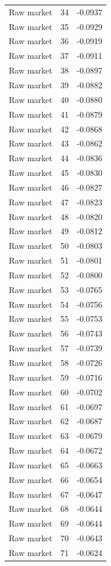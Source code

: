 \begin{table}[htbp]
\begin{tabular}{lll}
Raw market & 34 & -0.0937 \\
Raw market & 35 & -0.0929 \\
Raw market & 36 & -0.0919 \\
Raw market & 37 & -0.0911 \\
Raw market & 38 & -0.0897 \\
Raw market & 39 & -0.0882 \\
Raw market & 40 & -0.0880 \\
Raw market & 41 & -0.0879 \\
Raw market & 42 & -0.0868 \\
Raw market & 43 & -0.0862 \\
Raw market & 44 & -0.0836 \\
Raw market & 45 & -0.0830 \\
Raw market & 46 & -0.0827 \\
Raw market & 47 & -0.0823 \\
Raw market & 48 & -0.0820 \\
Raw market & 49 & -0.0812 \\
Raw market & 50 & -0.0803 \\
Raw market & 51 & -0.0801 \\
Raw market & 52 & -0.0800 \\
Raw market & 53 & -0.0765 \\
Raw market & 54 & -0.0756 \\
Raw market & 55 & -0.0753 \\
Raw market & 56 & -0.0743 \\
Raw market & 57 & -0.0739 \\
Raw market & 58 & -0.0726 \\
Raw market & 59 & -0.0716 \\
Raw market & 60 & -0.0702 \\
Raw market & 61 & -0.0697 \\
Raw market & 62 & -0.0687 \\
Raw market & 63 & -0.0679 \\
Raw market & 64 & -0.0672 \\
Raw market & 65 & -0.0663 \\
Raw market & 66 & -0.0654 \\
Raw market & 67 & -0.0647 \\
Raw market & 68 & -0.0644 \\
Raw market & 69 & -0.0644 \\
Raw market & 70 & -0.0643 \\
Raw market & 71 & -0.0624 \\

\end{tabular}
\end{table}
